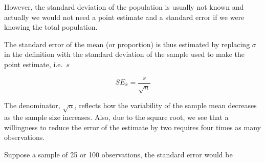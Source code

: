 \documentclass[
  letterpaper,
  DIV=11,
  numbers=noendperiod]{scrreprt}
\newenvironment{Shaded}{\begin{snugshade}}{\end{snugshade}}
\newcommand{\CommentTok}[1]{\textcolor[rgb]{0.37,0.37,0.37}{#1}}
\newcommand{\DecValTok}[1]{\textcolor[rgb]{0.68,0.00,0.00}{#1}}
\newcommand{\FunctionTok}[1]{\textcolor[rgb]{0.28,0.35,0.67}{#1}}
\newcommand{\NormalTok}[1]{\textcolor[rgb]{0.00,0.23,0.31}{#1}}
\newcommand{\OtherTok}[1]{\textcolor[rgb]{0.00,0.23,0.31}{#1}}
\newcommand{\SpecialCharTok}[1]{\textcolor[rgb]{0.37,0.37,0.37}{#1}}
\newcommand{\StringTok}[1]{\textcolor[rgb]{0.13,0.47,0.30}{#1}}
\begin{document}
However, the standard deviation of the population is usually not known
and actually we would not need a point estimate and a standard error if
we were knowing the total population.

The standard error of the mean (or proportion) is thus estimated by
replacing \(\sigma\) in the definition with the standard deviation of
the sample used to make the point estimate, i.e.~\(s\)

\[SE_{\bar{x}} = \dfrac{s}{\sqrt{n}}\]

The denominator, \(\sqrt{n}\), reflects how the variability of the
sample mean decreases as the sample size increases. Also, due to the
square root, we see that a willingness to reduce the error of the
estimate by two requires four times as many observations.

Suppose a sample of 25 or 100 observations, the standard error would be

\begin{Shaded}
\end{Shaded}
\end{document}

